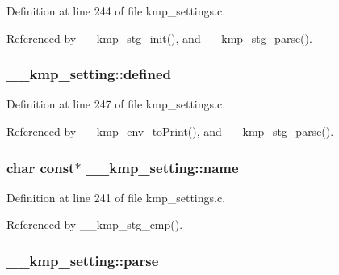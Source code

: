 Definition at line 244 of file kmp\-\_\-settings.\-c.



Referenced by \-\_\-\-\_\-kmp\-\_\-stg\-\_\-init(), and \-\_\-\-\_\-kmp\-\_\-stg\-\_\-parse().

\hypertarget{struct____kmp__setting_a2dc6c85979b5c20f2abc6fe6673b8eff}{
\subsubsection[{defined}]{ \-\_\-\-\_\-kmp\-\_\-setting\-::defined}}\label{struct____kmp__setting_a2dc6c85979b5c20f2abc6fe6673b8eff}


Definition at line 247 of file kmp\-\_\-settings.\-c.



Referenced by \-\_\-\-\_\-kmp\-\_\-env\-\_\-to\-Print(), and \-\_\-\-\_\-kmp\-\_\-stg\-\_\-parse().

\hypertarget{struct____kmp__setting_a861a8d3d2efb6a13416092e900db6a32}{
\subsubsection[{name}]{\setlength{\rightskip}{0pt plus 5cm}char const$\ast$ \-\_\-\-\_\-kmp\-\_\-setting\-::name}}\label{struct____kmp__setting_a861a8d3d2efb6a13416092e900db6a32}


Definition at line 241 of file kmp\-\_\-settings.\-c.



Referenced by \-\_\-\-\_\-kmp\-\_\-stg\-\_\-cmp().

\hypertarget{struct____kmp__setting_a6484e637e780c6fb5b85e129e0e74e59}{
\subsubsection[{parse}]{ \-\_\-\-\_\-kmp\-\_\-setting\-::parse}}\label{struct____kmp__setting_a6484e637e780c6fb5b85e129e0e74e59}


